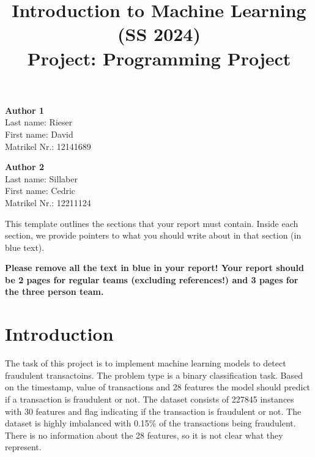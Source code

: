 \documentclass[a4paper, 10pt, conference]{ieeeconf}      %
\title{\LARGE \bf
Introduction to Machine Learning (SS 2024)\\ Project: Programming Project
\vspace{-3em}
}
\begin{document}
\maketitle
\vspace{-3em}
\thispagestyle{empty}
\pagestyle{empty}

\begin{strip}
\begin{tcolorbox}[
size=tight,
colback=white,
boxrule=0.2mm,
left=3mm,right=3mm, top=3mm, bottom=1mm
]
{\begin{multicols}{2}%

\textbf{Author 1}\\
Last name: Rieser\\
First name: David\\
Matrikel Nr.: 12141689\\

\columnbreak

\textbf{Author 2}\\
Last name: Sillaber\\
First name: Cedric\\ 
Matrikel Nr.: 12211124\\ 

\columnbreak

\end{multicols}}
\end{tcolorbox}
\end{strip}



{\color{blue}
  \noindent This template outlines the sections that your report must 
  contain. Inside each section, we provide pointers to what you should
  write about in that section (in blue text).  \linebreak

\noindent \textbf{Please remove all the text in blue in your report!
  Your report should be 2 pages for regular teams (excluding references!)
  and 3 pages for the three person team.}  }

\section{Introduction}
\label{sec:intro}
The task of this project is to implement machine learning models to detect fraudulent transactoins. 
The problem type is a binary classification task. Based on the timestamp, value of transactions and 28 features the model should predict if a transaction is fraudulent or not. 
The dataset consists of 227845 instances with 30 features and flag indicating if the transaction is fraudulent or not. The dataset is highly imbalanced with 0.15\% %
of the transactions being fraudulent. There is no information about the 28 features, so it is not clear what they represent. 
\end{document}
